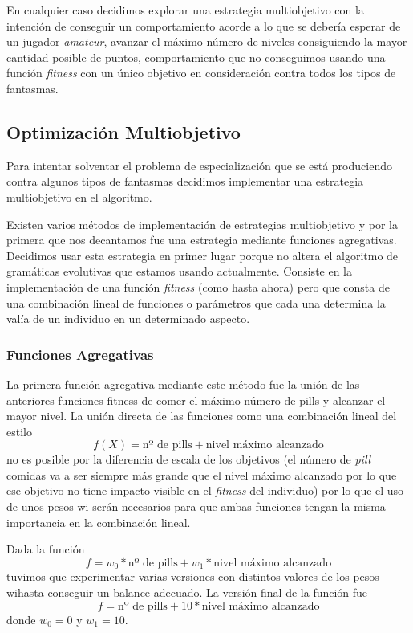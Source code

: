 En cualquier caso decidimos explorar una estrategia multiobjetivo con la intención de conseguir un comportamiento acorde a lo que se debería esperar de un jugador \textit{amateur}, avanzar el máximo número de niveles consiguiendo la mayor cantidad posible de puntos, comportamiento que no conseguimos usando una función \textit{fitness} con un único objetivo en consideración contra todos los tipos de fantasmas.

\subsection{Optimización Multiobjetivo}
Para intentar solventar el problema de especialización que se está produciendo contra algunos tipos de fantasmas decidimos implementar una estrategia multiobjetivo en el algoritmo.

Existen varios métodos de implementación de estrategias multiobjetivo y por la primera que nos decantamos fue una estrategia mediante funciones agregativas. Decidimos usar esta estrategia en primer lugar porque no altera el algoritmo de gramáticas evolutivas que estamos usando actualmente. Consiste en la implementación de una función \textit{fitness} (como hasta ahora) pero que consta de una combinación lineal de funciones o parámetros que cada una determina la valía de un individuo en un determinado aspecto.

\subsubsection{Funciones Agregativas}
La primera función agregativa mediante este método fue la unión de las anteriores funciones fitness de comer el máximo número de pills y alcanzar el mayor nivel. La unión directa de las funciones como una combinación lineal del estilo
\begin{equation}
f(X) = \textrm{nº de pills} + \textrm{nivel máximo alcanzado}
\end{equation}
no es posible por la diferencia de escala de los objetivos (el número de \textit{pill} comidas va a ser siempre más grande que el nivel máximo alcanzado por lo que ese objetivo no tiene impacto visible en el \textit{fitness} del individuo) por lo que el uso de unos pesos wi serán necesarios para que ambas funciones tengan la misma importancia en la combinación lineal.

Dada la función
\begin{equation}
f = w_0 * \textrm{nº de pills} + w_1 * \textrm{nivel máximo alcanzado}
\end{equation}
tuvimos que experimentar varias versiones con distintos valores de los pesos wihasta conseguir un balance adecuado. La versión final de la función fue
\begin{equation}
f = \textrm{nº de pills} + 10 * \textrm{nivel máximo alcanzado}
\end{equation}
donde $w_0 = 0$ y $w_1 = 10$.

